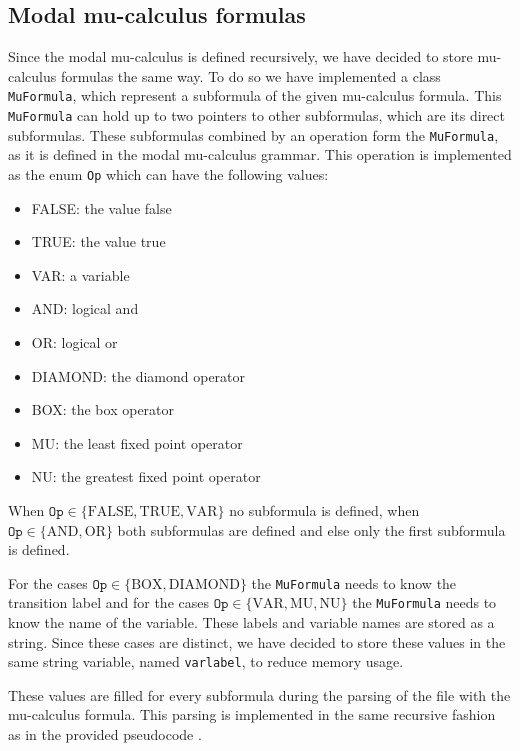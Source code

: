 \documentclass[10pt,a4paper]{article}
\begin{document}
\subsection{Modal mu-calculus formulas}
Since the modal mu-calculus is defined recursively, we have decided to store mu-calculus formulas the same way. To do so we have implemented a class \texttt{MuFormula}, which represent a subformula of the given mu-calculus formula. This \texttt{MuFormula} can hold up to two pointers to other subformulas, which are its direct subformulas. These subformulas combined by an operation form the \texttt{MuFormula}, as it is defined in the modal mu-calculus grammar. This operation is implemented as the enum \texttt{Op} which can have the following values:

\begin{itemize}
\item FALSE: the value false
\item TRUE: the value true
\item VAR: a variable
\item AND: logical and
\item OR: logical or
\item DIAMOND: the diamond operator
\item BOX: the box operator
\item MU: the least fixed point operator
\item NU: the greatest fixed point operator
\end{itemize}

When $\texttt{Op} \in \{\text{FALSE}, \text{TRUE}, \text{VAR}\}$ no subformula is defined, when \\ $\texttt{Op} \in \{\text{AND}, \text{OR}\}$ both subformulas are defined and else only the first subformula is defined.

For the cases $\texttt{Op} \in \{\text{BOX}, \text{DIAMOND}\}$ the \texttt{MuFormula} needs to know the transition label and for the cases $\texttt{Op} \in \{\text{VAR}, \text{MU}, \text{NU}\}$ the \texttt{MuFormula} needs to know the name of the variable. These labels and variable names are stored as a string. Since these cases are distinct, we have decided to store these values in the same string variable, named \texttt{varlabel}, to reduce memory usage.

These values are filled for every subformula during the parsing of the file with the mu-calculus formula. This parsing is implemented in the same recursive fashion as in the provided pseudocode \cite{muparse}.
\end{document}
